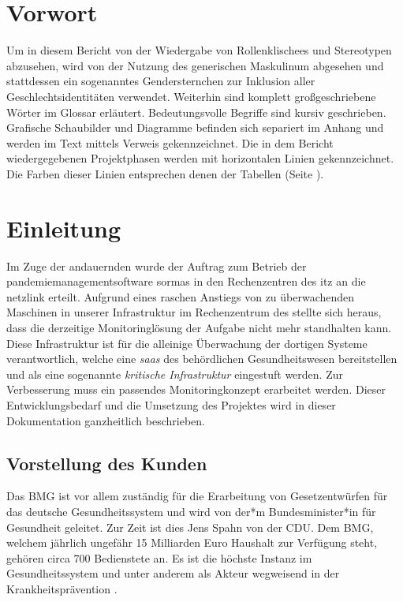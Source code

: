\documentclass[11pt,a4paper]{article}
\begin{document}
\section*{Vorwort}
Um in diesem Bericht von der Wiedergabe von Rollenklischees und Stereotypen abzusehen,
wird von der Nutzung des generischen Maskulinum abgesehen und stattdessen ein sogenanntes
Gendersternchen zur Inklusion aller Geschlechtsidentitäten verwendet.
Weiterhin sind komplett großgeschriebene Wörter im Glossar erläutert.
Bedeutungsvolle Begriffe sind kursiv geschrieben.
Grafische Schaubilder und Diagramme befinden sich separiert im Anhang und werden im Text mittels
Verweis gekennzeichnet. Die in dem Bericht wiedergegebenen Projektphasen werden mit horizontalen Linien gekennzeichnet.
Die Farben dieser Linien entsprechen denen der Tabellen (Seite \pageref{table:gantt}).
\newpage

\thispagestyle{empty}
\tableofcontents

\clearpage
{}
\setcounter{page}{1}
\selectfont
\section{Einleitung}
Im Zuge der andauernden 
wurde der Auftrag zum Betrieb der \gls{pandemiemanagementsoftware} \gls{sormas} in den Rechenzentren
des \gls{itz} an die \gls{netzlink} erteilt.
Aufgrund eines raschen Anstiegs von zu überwachenden Maschinen in unserer Infrastruktur
im Rechenzentrum des  stellte sich heraus, dass die derzeitige Monitoringlösung
der Aufgabe nicht mehr standhalten kann. Diese Infrastruktur ist für die alleinige Überwachung
der dortigen Systeme verantwortlich, welche eine \emph{\gls{saas}} des behördlichen Gesundheitswesen
bereitstellen und als eine sogenannte \emph{kritische Infrastruktur} eingestuft werden.
Zur Verbesserung muss ein passendes Monitoringkonzept erarbeitet werden.
Dieser Entwicklungsbedarf und die Umsetzung des Projektes wird in dieser Dokumentation ganzheitlich
beschrieben.
\subsection{Vorstellung des Kunden}
Das \gls{BMG} ist vor allem zuständig für die Erarbeitung von Gesetzentwürfen
für das deutsche Gesundheitssystem und wird von der*m Bundesminister*in für Gesundheit geleitet.
Zur Zeit ist dies Jens Spahn von der \gls{CDU}.
Dem \gls{BMG}, welchem jährlich ungefähr 15 Milliarden Euro
Haushalt zur Verfügung steht, gehören circa 700 Bedienstete an. Es ist die höchste Instanz im Gesundheitssystem und
unter anderem als Akteur wegweisend in der Krankheitsprävention \cite{bundesgesundheitsministerium}.
\end{document}
